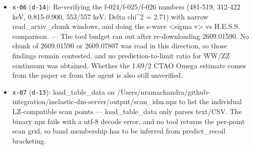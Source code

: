 \documentclass[11pt,a4paper]{article}
\begin{document}
\begin{itemize}
  \item \texttt{x-06} (\texttt{d-14}): Re-verifying the f-024/f-025/f-026 numbers (481-519, 312-422 keV, 0.815-0.900, 553/557 keV, Delta chi\textasciicircum{}2 = 2.71) with narrow read\_arxiv\_chunk windows, and doing the s-wave \textless{}sigma v\textgreater{} vs H.E.S.S. comparison. --- The tool budget ran out after re-downloading 2609.01590. No chunk of 2609.01590 or 2609.07807 was read in this direction, so those findings remain contested, and no prediction-to-limit ratio for WW/ZZ continuum was obtained. Whether the 1.69/2 CTAO Omega estimate comes from the paper or from the agent is also still unverified.
  \item \texttt{x-07} (\texttt{d-13}): load\_table\_data on /Users/nramachandra/github-integration/inelastic-dm-server/output/scan\_idm.npz to list the individual LZ-compatible scan points --- load\_table\_data only parses text/CSV. The binary npz fails with a utf-8 decode error, and no tool returns the per-point scan grid, so band membership has to be inferred from predict\_recoil bracketing.
\end{itemize}
\end{document}
